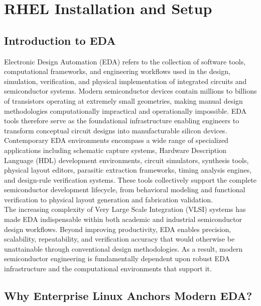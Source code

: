 \chapter{RHEL Installation and Setup}


\section{Introduction to EDA}

Electronic Design Automation (EDA) refers to the collection of software tools, computational frameworks, and engineering workflows used in the design, simulation, verification, and physical implementation of integrated circuits and semiconductor systems. Modern semiconductor devices contain millions to billions of transistors operating at extremely small geometries, making manual design methodologies computationally impractical and operationally impossible. EDA tools therefore serve as the foundational infrastructure enabling engineers to transform conceptual circuit designs into manufacturable silicon devices. \\ 

Contemporary EDA environments encompass a wide range of specialized applications including schematic capture systems, Hardware Description Language (HDL) development environments, circuit simulators, synthesis tools, physical layout editors, parasitic extraction frameworks, timing analysis engines, and design-rule verification systems. These tools collectively support the complete semiconductor development lifecycle, from behavioral modeling and functional verification to physical layout generation and fabrication validation.\\

The increasing complexity of Very Large Scale Integration (VLSI) systems has made EDA indispensable within both academic and industrial semiconductor design workflows. Beyond improving productivity, EDA enables precision, scalability, repeatability, and verification accuracy that would otherwise be unattainable through conventional design methodologies. As a result, modern semiconductor engineering is fundamentally dependent upon robust EDA infrastructure and the computational environments that support it.\\

\section{Why Enterprise Linux Anchors Modern EDA?}

